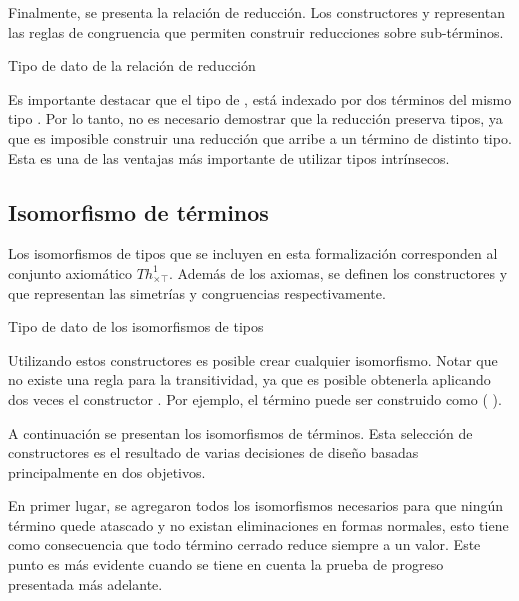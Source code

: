 Finalmente, se presenta la relación de reducción.
Los constructores \const{$\xi$} y \const{$\zeta$} representan las reglas de congruencia que permiten construir reducciones sobre sub-términos.

\begin{codigo}
	Tipo de dato de la relación de reducción
	
\end{codigo}

Es importante destacar que el tipo de \type{$\_\hookrightarrow\_$}, está indexado por dos términos del mismo tipo .
Por lo tanto, no es necesario demostrar que la reducción preserva tipos, ya que es imposible construir una reducción que arribe a un término de distinto tipo.
Esta es una de las ventajas más importante de utilizar tipos intrínsecos.


\subsection{Isomorfismo de términos}

Los isomorfismos de tipos que se incluyen en esta formalización corresponden al conjunto axiomático $Th^1_{\times\top}$.
Además de los axiomas, se definen los constructores  y  que representan las simetrías y congruencias respectivamente.

\begin{codigo}
	Tipo de dato de los isomorfismos de tipos
	
\end{codigo}

Utilizando estos constructores es posible crear cualquier isomorfismo.
Notar que no existe una regla para la transitividad, ya que es posible obtenerla aplicando dos veces el constructor \const{$[\_]\equiv\_$}.
Por ejemplo, el término \const{[ trans}   \const{]$\equiv$}  puede ser construido como \const{[}  \const{]$\equiv$} (\const{[}  \const{]$\equiv$} ).

A continuación se presentan los isomorfismos de términos.
Esta selección de constructores es el resultado de varias decisiones de diseño basadas principalmente en dos objetivos.

En primer lugar, se agregaron todos los isomorfismos necesarios para que ningún término quede atascado y no existan eliminaciones en formas normales, esto tiene como consecuencia que todo término cerrado reduce siempre a un valor.
Este punto es más evidente cuando se tiene en cuenta la prueba de progreso presentada más adelante.

